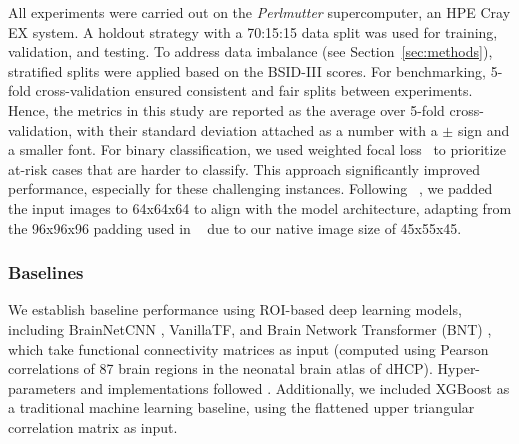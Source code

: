 \documentclass[runningheads,a4paper]{llncs}
\begin{document}
All experiments were carried out on the \emph{Perlmutter} supercomputer, an HPE Cray EX system. A holdout strategy with a 70:15:15 data split was used for training, validation, and testing. To address data imbalance (see Section~\ref{sec:methods}), stratified splits were applied based on the BSID-III scores. For benchmarking, 5-fold cross-validation ensured consistent and fair splits between experiments. Hence, the metrics in this study are reported as the average over 5-fold cross-validation, with their standard deviation attached as a number with a $\pm$ sign and a smaller font.
%
For binary classification, we used weighted focal loss~\cite{lin2018focallossdenseobject} to prioritize at-risk cases that are harder to classify. This approach significantly improved performance, especially for these challenging instances.
%
Following ~\cite{kim2023swiftswin4dfmri}, we padded the input images to 64x64x64 to align with the model architecture, adapting from the 96x96x96 padding used in ~\cite{kim2023swiftswin4dfmri} due to our native image size of 45x55x45.
%

\subsubsection{Baselines}

We establish baseline performance using ROI-based deep learning models, including BrainNetCNN \cite{KAWAHARA20171038}, VanillaTF, and Brain Network Transformer (BNT) \cite{KAN2022}, which take functional connectivity matrices as input (computed using Pearson correlations of 87 brain regions in the neonatal brain atlas of dHCP). Hyper-parameters and implementations followed \cite{KAN2022}. Additionally, we included XGBoost \cite{CHEN2016} as a traditional machine learning baseline, using the flattened upper triangular correlation matrix as input.
\end{document}
